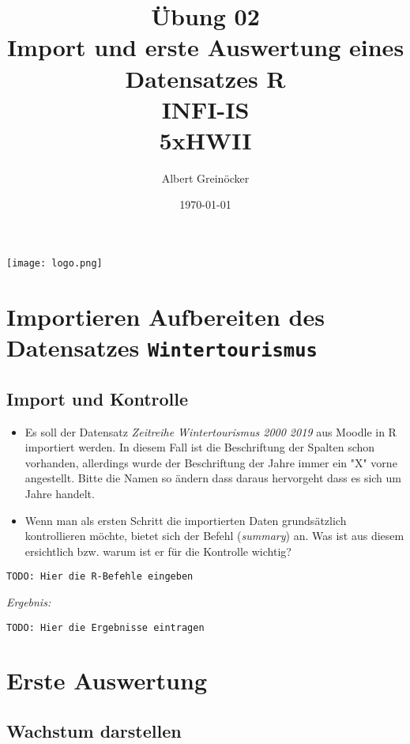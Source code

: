 \documentclass{article}
\title{Übung 02 \\ Import und erste Auswertung eines Datensatzes \textbf{R} \\ INFI-IS \\ 5xHWII}
\author{Albert Greinöcker} %
\date{\today} %
\begin{document}
\maketitle %

\begin{center}

\texttt{[image: logo.png]}
\end{center}
\vspace{1cm}

\section{Importieren Aufbereiten des Datensatzes \texttt{Wintertourismus}}

\subsection{Import und Kontrolle}


\begin{itemize}
	\item Es soll der Datensatz \textit{Zeitreihe Wintertourismus 2000 2019} aus Moodle in R importiert werden. In diesem Fall ist die Beschriftung der Spalten schon vorhanden, allerdings wurde der Beschriftung der Jahre immer ein "X" vorne angestellt. Bitte die Namen so ändern dass daraus hervorgeht dass es sich um Jahre handelt.
	\item Wenn man als ersten Schritt die importierten Daten grundsätzlich kontrollieren möchte, bietet sich der Befehl (\emph{summary}) an. Was ist aus diesem ersichtlich bzw. warum ist er für die Kontrolle wichtig?
\end{itemize}


\begin{lstlisting}
TODO: Hier die R-Befehle eingeben
\end{lstlisting}

\textit{Ergebnis:}

\begin{verbatim}
TODO: Hier die Ergebnisse eintragen
\end{verbatim}

\section{Erste Auswertung}

\subsection{Wachstum darstellen}
\end{document}
